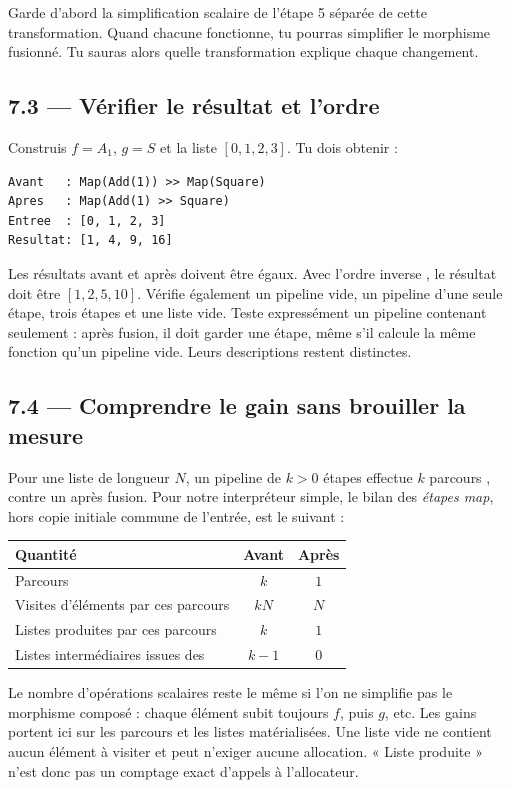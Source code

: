 \documentclass[11pt,a4paper]{article}
\newcommand{\code}[1]{\texttt{\detokenize{#1}}}
\begin{document}
Garde d'abord la simplification scalaire de l'étape 5 séparée de cette
transformation. Quand chacune fonctionne, tu pourras simplifier le morphisme
fusionné. Tu sauras alors quelle transformation explique chaque changement.

\subsection{7.3 — Vérifier le résultat et l'ordre}
Construis \(f=A_1\), \(g=S\) et la liste \([0,1,2,3]\). Tu dois obtenir :
\begin{lstlisting}[style=plain]
Avant   : Map(Add(1)) >> Map(Square)
Apres   : Map(Add(1) >> Square)
Entree  : [0, 1, 2, 3]
Resultat: [1, 4, 9, 16]
\end{lstlisting}
Les résultats avant et après doivent être égaux. Avec l'ordre inverse
\code{[g, f]}, le résultat doit être \([1,2,5,10]\). Vérifie également
un pipeline vide, un pipeline d'une seule étape, trois étapes et une liste vide.
Teste expressément un pipeline contenant seulement \code{identity()} :
après fusion, il doit garder une étape, même s'il calcule la même fonction
qu'un pipeline vide. Leurs descriptions restent distinctes.

\newpage
\subsection{7.4 — Comprendre le gain sans brouiller la mesure}
Pour une liste de longueur \(N\), un pipeline de \(k>0\) étapes effectue
\(k\) parcours \code{map_values}, contre un après fusion. Pour notre
interpréteur simple, le bilan des \emph{étapes map}, hors copie initiale
commune de l'entrée, est le suivant :

\begin{center}
\begin{tabular}{lcc}
\toprule
Quantité & Avant & Après \\
\midrule
Parcours \code{map_values} & \(k\) & \(1\) \\
Visites d'éléments par ces parcours & \(kN\) & \(N\) \\
Listes produites par ces parcours & \(k\) & \(1\) \\
Listes intermédiaires issues des \code{map} & \(k-1\) & \(0\) \\
\bottomrule
\end{tabular}
\end{center}

Le nombre d'opérations scalaires reste le même si l'on ne simplifie pas
le morphisme composé : chaque élément subit toujours \(f\), puis \(g\), etc.
Les gains portent ici sur les parcours et les listes matérialisées.
Une liste vide ne contient aucun élément à visiter et peut n'exiger aucune
allocation. « Liste produite » n'est donc pas un comptage exact d'appels
à l'allocateur.
\end{document}
